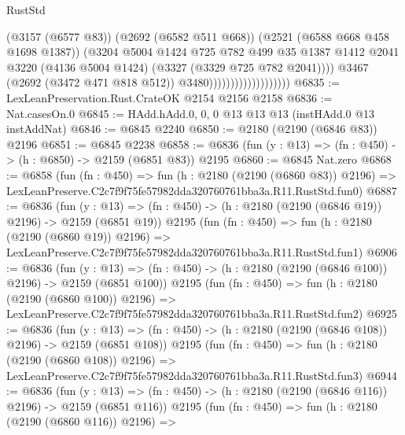 \begin{lexlean}{RustStd}
\begin{coremodule}
                                            (@3157 (@6577 @83))
                                            (@2692 (@6582 @511 @668))
                                            (@2521 (@6588 @668 @458 @1698 @1387))
                                            (@3204
                                              @5004
                                              @1424
                                              @725
                                              @782
                                              @499
                                              @35
                                              @1387
                                              @1412
                                              @2041
                                              @3220
                                              (@4136 @5004 @1424)
                                              (@3327 (@3329 @725 @782 @2041))))
                                          @3467
                                          (@2692 (@3472 @471 @818 @512))
                                          @3480)))))))))))))))))))
@6835 := LexLeanPreservation.Rust.CrateOK @2154 @2156 @2158
@6836 := Nat.casesOn.{0}
@6845 := HAdd.hAdd.{0, 0, 0} @13 @13 @13 (instHAdd.{0} @13 instAddNat)
@6846 := @6845 @2240
@6850 := @2180 (@2190 (@6846 @83)) @2196
@6851 := @6845 @2238
@6858 := @6836 (fun (y : @13) => (fn : @450) -> (h : @6850) -> @2159 (@6851 @83)) @2195
@6860 := @6845 Nat.zero
@6868 := @6858
    (fun (fn : @450) =>
    fun (h : @2180 (@2190 (@6860 @83)) @2196) =>
    LexLeanPreserve.C2c7f9f75fe57982dda320760761bba3a.R11.RustStd.fun0)
@6887 := @6836
    (fun (y : @13) => (fn : @450) -> (h : @2180 (@2190 (@6846 @19)) @2196) -> @2159 (@6851 @19))
    @2195
    (fun (fn : @450) =>
    fun (h : @2180 (@2190 (@6860 @19)) @2196) =>
    LexLeanPreserve.C2c7f9f75fe57982dda320760761bba3a.R11.RustStd.fun1)
@6906 := @6836
    (fun (y : @13) => (fn : @450) -> (h : @2180 (@2190 (@6846 @100)) @2196) -> @2159 (@6851 @100))
    @2195
    (fun (fn : @450) =>
    fun (h : @2180 (@2190 (@6860 @100)) @2196) =>
    LexLeanPreserve.C2c7f9f75fe57982dda320760761bba3a.R11.RustStd.fun2)
@6925 := @6836
    (fun (y : @13) => (fn : @450) -> (h : @2180 (@2190 (@6846 @108)) @2196) -> @2159 (@6851 @108))
    @2195
    (fun (fn : @450) =>
    fun (h : @2180 (@2190 (@6860 @108)) @2196) =>
    LexLeanPreserve.C2c7f9f75fe57982dda320760761bba3a.R11.RustStd.fun3)
@6944 := @6836
    (fun (y : @13) => (fn : @450) -> (h : @2180 (@2190 (@6846 @116)) @2196) -> @2159 (@6851 @116))
    @2195
    (fun (fn : @450) =>
    fun (h : @2180 (@2190 (@6860 @116)) @2196) =>

\end{coremodule}
\end{lexlean}

